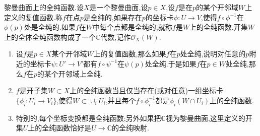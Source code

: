 黎曼曲面上的全纯函数.设$X$是一个黎曼曲面,设$p\in X$,设$f$是在$p$的某个开邻域$W$上定义的复值函数.称$f$在点$p$是全纯的,如果存在$p$的坐标卡$\phi:U\to V$,使得$f\circ\phi^{-1}$在$\phi(p)$处是全纯的.如果$f$在$W$中每个点都是全纯的,就称$f$是$W$上的全纯函数.开集$W$上的全体全纯函数构成了一个$\mathbb{C}$代数,记作$\mathscr{O}_X(W)$.
\begin{enumerate}
	\item 设$f$是$p\in X$某个开邻域$W$上的复值函数,那么如果$f$在$p$处全纯,说明对任意的$p$附近的坐标卡$\psi:U'\to V'$都有$f\circ\psi^{-1}$在$\psi(p)$处全纯.于是如果$f$在$p\in W$处全纯,那么$f$在$p$的某个开邻域上全纯.
	\item $f$是开子集$W\subset X$上的全纯函数当且仅当存在(或对任意)一组坐标卡$\{\phi_i:U_i\to V_i\}$,使得$W\subset\cup_iU_i$,并且每个$f\circ\phi_i^{-1}$都是$\phi_i(W\cap U_i)$上的全纯函数.
	\item 特别的,每个坐标变换都是全纯函数;另外如果把$\mathbb{C}$视为黎曼曲面,这里定义的开集$U$上的全纯函数恰好是$U\to\mathbb{C}$的全纯映射.
\end{enumerate}

